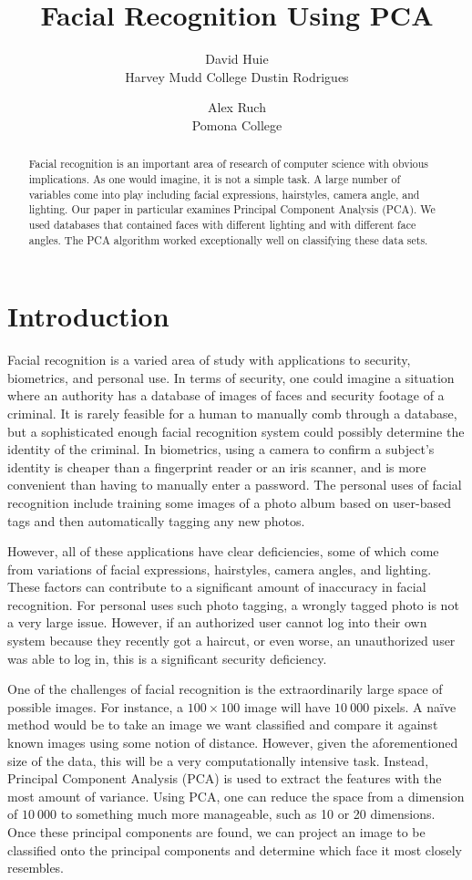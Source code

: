 \documentclass[letterpaper]{article}
\title{Facial Recognition Using PCA}
\author{David Huie \\ Harvey Mudd College \And Dustin Rodrigues \and
Alex Ruch \\ Pomona College}
\begin{document}
\nocite{pca} 
\nocite{pca2}
\nocopyright
\maketitle
\begin{abstract}
Facial recognition is an important area of research of computer science with obvious implications. As one would imagine, it is not a simple task.  A large number of variables come into play including facial expressions, hairstyles, camera angle, and lighting. Our paper in particular examines Principal Component Analysis (PCA).  We used databases that contained faces with different lighting and with different face angles.  The PCA algorithm worked exceptionally well on classifying these data sets.
\end{abstract}
\section{Introduction}
Facial recognition is a varied area of study with applications to security, biometrics, and personal use.  In terms of security, one could imagine a situation where an authority has a database of images of faces and security footage of a criminal.  It is rarely feasible for a human to manually comb through a database, but a sophisticated enough facial recognition system could possibly determine the identity of the criminal.  In biometrics, using a camera to confirm a subject's identity is cheaper than a fingerprint reader or an iris scanner, and is more convenient than having to manually enter a password.  The personal uses of facial recognition include training some images of a photo album based on user-based tags and then automatically tagging any new photos.

However, all of these applications have clear deficiencies, some of which come from variations of facial expressions, hairstyles, camera angles, and lighting.  These factors can contribute to a significant amount of inaccuracy in facial recognition. For personal uses such photo tagging, a wrongly tagged photo is not a very large issue.  However, if an authorized user cannot log into their own system because they recently got a haircut, or even worse, an unauthorized user was able to log in, this is a significant security deficiency. 

One of the challenges of facial recognition is the extraordinarily large space of possible images.  For instance, a $100\times100$ image will have $10\ 000$ pixels. A na\"ive method would be to take an image we want classified and compare it against known images using some notion of distance.  However, given the aforementioned size of the data, this will be a very computationally intensive task.  Instead, Principal Component Analysis (PCA) is used to extract the features with the most amount of variance. Using PCA, one can reduce the space from a dimension of $10\ 000$ to something much more manageable, such as 10 or 20 dimensions.  Once these principal components are found, we can project an image to be classified onto the principal components and determine which face it most closely resembles.
\end{document}
